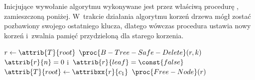 Inicjujące wywołanie algorytmu wykonywane jest przez właściwą procedurę , zamieszczoną poniżej.
W~trakcie działania algorytmu korzeń drzewa mógł zostać pozbawiony swojego ostatniego klucza, dlatego wówczas procedura  ustawia nowy korzeń i~zwalnia pamięć przydzieloną dla starego korzenia.
\begin{codebox}
    \li $r\gets\attrib{T}{root}$
    \li $\proc{B-Tree-Safe-Delete}(r,k)$
    \li \If $\attrib{r}{n}=0$ i~$\attrib{r}{leaf}=\const{false}$
    \li     \Then $\attrib{T}{root}\gets\attribxx{r}{c_1}$
    \li         $\proc{Free-Node}(r)$
            \End
\end{codebox}
